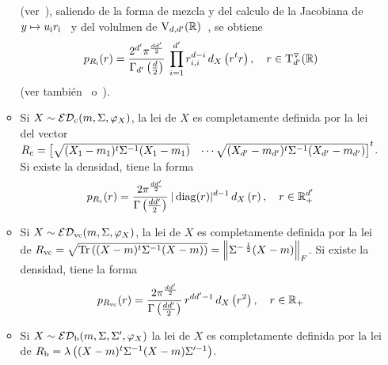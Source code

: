 \begin{itemize}
\begin{itemize}
    (ver~\cite{HorJoh13, Bha97}), saliendo  de la forma de mezcla  y del calculo
    de la Jacobiana de $y \mapsto u_{\mathrm{i}} r_{\mathrm{i}}$~\cite[Teo.~2.1.13]{Mui82} y del
    volulmen de $\mathrm{V}_{d,d'}(\mathbb{R})$~\cite[Teo.~2.1.15]{Mui82}, se obtiene
    \[
    p_{R_{\mathrm{i}}}(r)   =   \frac{2^{d'}   \pi^{\frac{d   d'}{2}}}{\Gamma_{d'}\left(
        \frac{d}{2} \right)} \:  \prod_{i=1}^{d'} r_{i,i}^{d-i} \, d_X\left( r^t
      r \right), \quad r \in \mathrm{T}^\triangledown_{d'}(\mathbb{R})
    \]
    (ver tambi\'en~\cite[Teo.~7.9.2]{And03} o~\cite{Dia13}).
  \item Si $X \sim \mathcal{ED}_{\mathrm{c}}(m,\Sigma,\varphi_X)$, la lei de $X$ es completamente
    definida por  la lei del vector $R_{\mathrm{c}}  = \begin{bmatrix} \sqrt{(X_1-m_1)^t
        \Sigma^{-1}  (X_1-m_1)}  &  \cdots  \sqrt{(X_{d'}-m_{d'})^t  \Sigma^{-1}
        (X_{d'}-m_{d'})} \end{bmatrix}^t$. Si existe la densidad, tiene la forma
    \[
    p_{R_{\mathrm{c}}}(r)  = \frac{2  \pi^{\frac{d d'}{2}}}{\Gamma\left(  \frac{d d'}{2}
      \right)} \: |\operatorname{diag}(r)|^{d-1} \, d_X\left( r \right), \quad r \in \mathbb{R}_+^{d'}
    \]
  \item   Si  $X  \sim   \mathcal{ED}_{\mathrm{vc}}(m,\Sigma,\varphi_X)$,  la   lei  de   $X$  es
    completamente  definida por  la lei  de $R_{\mathrm{vc}}  =  \sqrt{\operatorname{Tr}\left( (X-m)^t
        \Sigma^{-1}  (X-m)  \right)}  =  \left\|  \Sigma^{-  \,  \frac12}  (X-m)
    \right\|_F$. Si existe la densidad, tiene la forma
    \[
    p_{R_{\mathrm{vc}}}(r) =  \frac{2 \pi^{\frac{d d'}{2}}}{\Gamma\left(  \frac{d d'}{2}
      \right)} \, r^{d d'-1} \, d_X\left( r^2 \right), \quad r \in \mathbb{R}_+
    \]
  \item  Si  $X \sim  \mathcal{ED}_{\mathrm{b}}(m,\Sigma,\Sigma',\varphi_X)$  la  lei  de $X$  es
    completamente  definida  por  la  lei  de $R_{\mathrm{b}}  =  \lambda\left(  (X-m)^t
      \Sigma^{-1} (X-m) \Sigma'^{-1} \right)$.
  \end{itemize}
%
%
%
\end{itemize}

